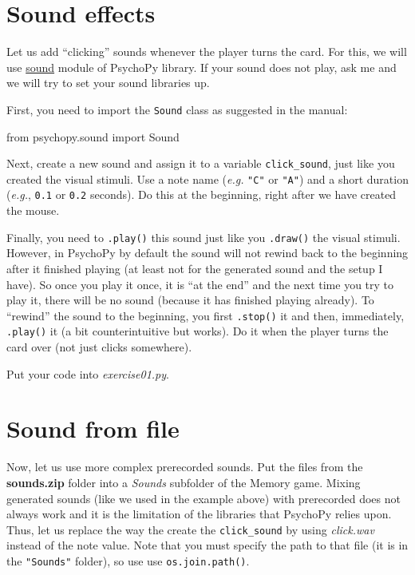 \documentclass[
]{book}
\newenvironment{Shaded}{\begin{snugshade}}{\end{snugshade}}
\newcommand{\ImportTok}[1]{#1}
\newcommand{\NormalTok}[1]{#1}
\begin{document}
\hypertarget{sound-effects}{%
\section{Sound effects}\label{sound-effects}}

Let us add ``clicking'' sounds whenever the player turns the card. For this, we will use \href{https://psychopy.org/api/sound.html}{sound} module of PsychoPy library. If your sound does not play, ask me and we will try to set your sound libraries up.

First, you need to import the \texttt{Sound} class as suggested in the manual:

\begin{Shaded}
\begin{Highlighting}[]
\ImportTok{from}\NormalTok{ psychopy.sound }\ImportTok{import}\NormalTok{ Sound}
\end{Highlighting}
\end{Shaded}

Next, create a new sound and assign it to a variable \texttt{click\_sound}, just like you created the visual stimuli. Use a note name (\emph{e.g.} \texttt{"C"} or \texttt{"A"}) and a short duration (\emph{e.g.}, \texttt{0.1} or \texttt{0.2} seconds). Do this at the beginning, right after we have created the mouse.

Finally, you need to \texttt{.play()} this sound just like you \texttt{.draw()} the visual stimuli. However, in PsychoPy by default the sound will not rewind back to the beginning after it finished playing (at least not for the generated sound and the setup I have). So once you play it once, it is ``at the end'' and the next time you try to play it, there will be no sound (because it has finished playing already). To ``rewind'' the sound to the beginning, you first \texttt{.stop()} it and then, immediately, \texttt{.play()} it (a bit counterintuitive but works). Do it when the player turns the card over (not just clicks somewhere).

Put your code into \emph{exercise01.py}.

\hypertarget{sound-from-file}{%
\section{Sound from file}\label{sound-from-file}}

Now, let us use more complex prerecorded sounds. Put the files from the \textbf{sounds.zip} folder into a \emph{Sounds} subfolder of the Memory game. Mixing generated sounds (like we used in the example above) with prerecorded does not always work and it is the limitation of the libraries that PsychoPy relies upon. Thus, let us replace the way the create the \texttt{click\_sound} by using \emph{click.wav} instead of the note value. Note that you must specify the path to that file (it is in the \texttt{"Sounds"} folder), so use use \texttt{os.join.path()}.
\end{document}
